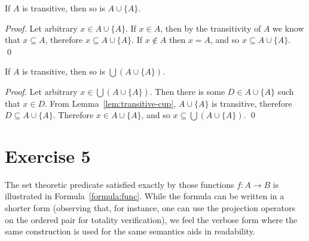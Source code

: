 \documentclass[11pt]{llncs}
\begin{document}
\begin{lemma}\label{lem:transitive-cup}
  If $A$ is transitive, then so is $A \cup \{A\}$.
\end{lemma}
\begin{proof}
  Let arbitrary $x \in A \cup \{A\}$. If $x \in A$, then by the transitivity of
  $A$ we know that $x \subseteq A$, therefore $x \subseteq A \cup \{A\}$. If
  $x \not\in A$ then $x = A$, and so $x \subseteq A \cup \{A\}$.
  \qed
\end{proof}

\begin{lemma}
  If $A$ is transitive, then so is $\bigcup (A \cup \{A\})$.
\end{lemma}
\begin{proof}
  Let arbitrary $x \in \bigcup (A \cup \{A\})$. Then there is some
  $D \in A \cup \{A\}$ such that $x \in D$. From Lemma~\ref{lem:transitive-cup},
  $A \cup \{A\}$ is transitive, therefore $D \subseteq A \cup \{A\}$. Therefore
  $x \in A \cup \{A\}$, and so $x \subseteq \bigcup (A \cup \{A\})$.
  \qed
\end{proof}

\section*{Exercise 5}
The set theoretic predicate satisfied exactly by those functions
$f: A \longrightarrow B$ is illustrated in Formula~\ref{formula:func}. While the
formula can be written in a shorter form (observing that, for instance, one can
use the projection operators on the ordered pair for totality verification), we
feel the verbose form where the same construction is used for the same semantics
aids in readability.
\end{document}
